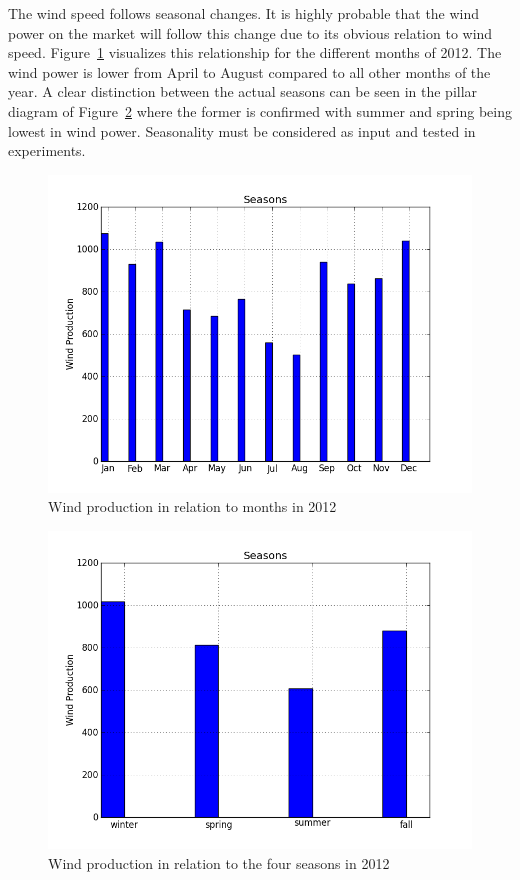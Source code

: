 The wind speed follows seasonal changes. It is highly probable that the wind power on the market will follow this change due to its obvious relation to wind speed. Figure~\ref{fig:windProductionMonths} visualizes this relationship for the different months of 2012. The wind power is lower from April to August compared to all other months of the year. A clear distinction between the actual seasons can be seen in the pillar diagram of Figure~\ref{fig:windProductionSeasons} where the former is confirmed with summer and spring being lowest in wind power. Seasonality must be considered as input and tested in experiments.

\begin{figure}[ht!]
\centering
\includegraphics[width=0.85\linewidth]{billeder/Seasons/windProductionMonths.png}
\caption{Wind production in relation to months in 2012}
\label{fig:windProductionMonths}
\end{figure}

\begin{figure}[ht!]
\centering
\includegraphics[width=0.85\linewidth]{billeder/Seasons/windProdctionSeasons.png}
\caption{Wind production in relation to the four seasons in 2012}
\label{fig:windProductionSeasons}
\end{figure}

